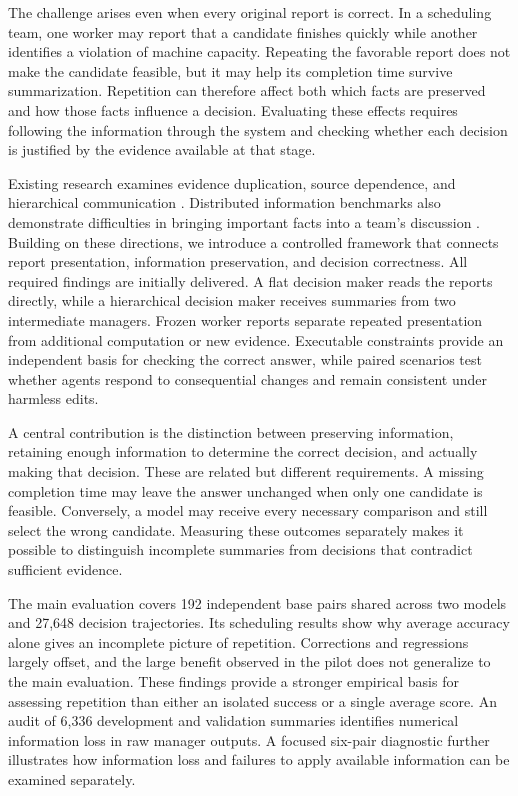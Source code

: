\documentclass{svproc}
\begin{document}
The challenge arises even when every original report is correct. In a scheduling team, one worker may report that a candidate finishes quickly while another identifies a violation of machine capacity. Repeating the favorable report does not make the candidate feasible, but it may help its completion time survive summarization. Repetition can therefore affect both which facts are preserved and how those facts influence a decision. Evaluating these effects requires following the information through the system and checking whether each decision is justified by the evidence available at that stage.

Existing research examines evidence duplication, source dependence, and hierarchical communication \cite{sybil,copies,scaling}. Distributed information benchmarks also demonstrate difficulties in bringing important facts into a team's discussion \cite{hidden}. Building on these directions, we introduce a controlled framework that connects report presentation, information preservation, and decision correctness. All required findings are initially delivered. A flat decision maker reads the reports directly, while a hierarchical decision maker receives summaries from two intermediate managers. Frozen worker reports separate repeated presentation from additional computation or new evidence. Executable constraints provide an independent basis for checking the correct answer, while paired scenarios test whether agents respond to consequential changes and remain consistent under harmless edits.

A central contribution is the distinction between preserving information, retaining enough information to determine the correct decision, and actually making that decision. These are related but different requirements. A missing completion time may leave the answer unchanged when only one candidate is feasible. Conversely, a model may receive every necessary comparison and still select the wrong candidate. Measuring these outcomes separately makes it possible to distinguish incomplete summaries from decisions that contradict sufficient evidence.

The main evaluation covers 192 independent base pairs shared across two models and 27,648 decision trajectories. Its scheduling results show why average accuracy alone gives an incomplete picture of repetition. Corrections and regressions largely offset, and the large benefit observed in the pilot does not generalize to the main evaluation. These findings provide a stronger empirical basis for assessing repetition than either an isolated success or a single average score. An audit of 6,336 development and validation summaries identifies numerical information loss in raw manager outputs. A focused six-pair diagnostic further illustrates how information loss and failures to apply available information can be examined separately.
\end{document}
